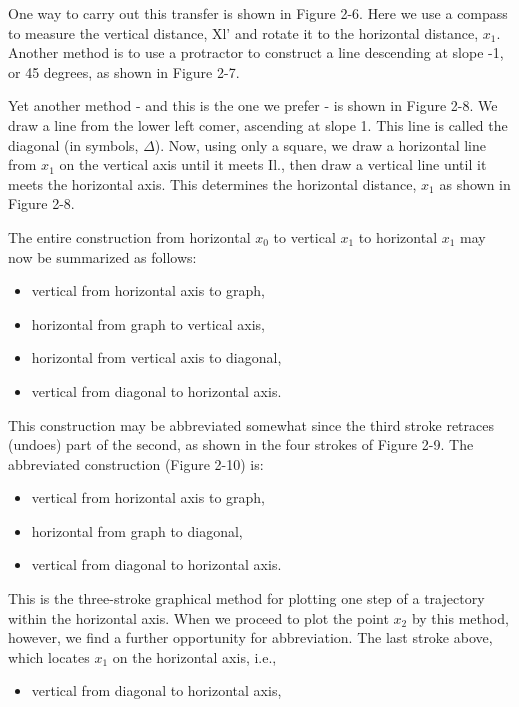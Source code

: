 \documentclass[12pt]{article}
\begin{document}
\hfill

One way to carry out this transfer is shown in Figure 2-6. Here
we use a compass to measure the vertical distance, Xl' and rotate it
to the horizontal distance, $x_1$. Another method is to use a protractor
to construct a line descending at slope -1, or 45 degrees, as shown
in Figure 2-7.

\hfill

Yet another method - and this is the one we prefer - is shown
in Figure 2-8. We draw a line from the lower left comer, ascending
at slope 1. This line is called the diagonal (in symbols, $\Delta$). Now,
using only a square, we draw a horizontal line from $x_1$ on the vertical
axis until it meets Il., then draw a vertical line until it meets the
horizontal axis. This determines the horizontal distance, $x_1$ as
shown in Figure 2-8.

\hfill

The entire construction from horizontal $x_0$ to vertical $x_1$ to horizontal $x_1$ may now be summarized as follows:

\begin{itemize}
\item vertical from horizontal axis to graph,
\item horizontal from graph to vertical axis,
\item horizontal from vertical axis to diagonal,
\item vertical from diagonal to horizontal axis.
\end{itemize}

This construction may be abbreviated somewhat since the third
stroke retraces (undoes) part of the second, as shown in the four
strokes of Figure 2-9. The abbreviated construction (Figure 2-10) is:

\begin{itemize}
\item vertical from horizontal axis to graph,
\item horizontal from graph to diagonal,
\item vertical from diagonal to horizontal axis.
\end{itemize}

This is the three-stroke graphical method for plotting one step
of a trajectory within the horizontal axis. When we proceed to plot
the point $x_2$ by this method, however, we find a further opportunity
for abbreviation. The last stroke above, which locates $x_1$ on the horizontal
axis, i.e.,

\begin{itemize}
\item vertical from diagonal to horizontal axis,
\end{itemize}
\end{document}
